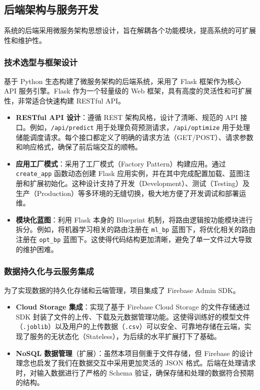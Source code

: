 \subsection{后端架构与服务开发}

系统的后端采用微服务架构思想设计，旨在解耦各个功能模块，提高系统的可扩展性和维护性。

\subsubsection{技术选型与框架设计}
基于 Python 生态构建了微服务架构的后端系统，采用了 Flask 框架\cite{grids2011flask}作为核心 API 服务引擎。Flask 作为一个轻量级的 Web 框架，具有高度的灵活性和可扩展性，非常适合快速构建 RESTful API。
\begin{itemize}
    \item \textbf{RESTful API 设计}：遵循 REST 架构风格，设计了清晰、规范的 API 接口。例如，\texttt{/api/predict} 用于处理负荷预测请求，\texttt{/api/optimize} 用于处理储能调度请求。每个接口都定义了明确的请求方法（GET/POST）、请求参数和响应格式，确保了前后端交互的顺畅。
    \item \textbf{应用工厂模式}：采用了工厂模式（Factory Pattern）构建应用。通过 \texttt{create\_app} 函数动态创建 Flask 应用实例，并在其中完成配置加载、蓝图注册和扩展初始化。这种设计支持了开发（Development）、测试（Testing）及生产（Production）等多环境的无缝切换，极大地方便了开发调试和部署运维。
    \item \textbf{模块化蓝图}：利用 Flask 本身的 Blueprint 机制，将路由逻辑按功能模块进行拆分。例如，将机器学习相关的路由注册在 \texttt{ml\_bp} 蓝图下，将优化相关的路由注册在 \texttt{opt\_bp} 蓝图下。这使得代码结构更加清晰，避免了单一文件过大导致的维护困难。
\end{itemize}

\subsubsection{数据持久化与云服务集成}
为了实现数据的持久化存储和云端管理，项目集成了 Firebase Admin SDK。
\begin{itemize}
    \item \textbf{Cloud Storage 集成}：实现了基于 Firebase Cloud Storage 的文件存储通过 SDK 封装了文件的上传、下载及元数据管理功能。这使得训练好的模型文件（\texttt{.joblib}）以及用户的上传数据（\texttt{.csv}）可以安全、可靠地存储在云端，实现了服务的无状态化（Stateless），为后续的水平扩展打下了基础。
    \item \textbf{NoSQL 数据管理}（扩展）：虽然本项目侧重于文件存储，但 Firebase 的设计理念也启发了我们在数据交互中采用更加灵活的 JSON 格式。后端在处理请求时，对输入数据进行了严格的 Schema 验证，确保存储和处理的数据符合预期的结构。
\end{itemize}

